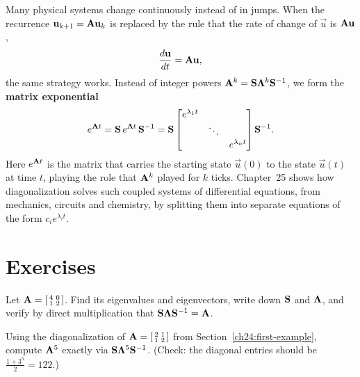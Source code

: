 Many physical systems change continuously instead of in jumps. When the
recurrence $\mathbf{u}_{k+1} = \mathbf{A}\mathbf{u}_k$ is replaced by the rule that the
rate of change of $\vec{u}$ is $\mathbf{A}\mathbf{u}$,
\[
  \frac{d\mathbf{u}}{dt} = \mathbf{A}\mathbf{u},
\]
the same strategy works. Instead of integer powers $\mathbf{A}^k = \mathbf{S}\mathbf{\Lambda}^k\mathbf{S}^{-1}$,
we form the \textbf{matrix exponential}
\[
  e^{\mathbf{A}t} = \mathbf{S}\,e^{\mathbf{\Lambda}t}\,\mathbf{S}^{-1}
  = \mathbf{S}\begin{bmatrix} e^{\lambda_1 t} & & \\ & \ddots & \\ & & e^{\lambda_n t} \end{bmatrix}\mathbf{S}^{-1}.
\]
Here $e^{\mathbf{A}t}$ is the matrix that carries the starting state $\vec{u}(0)$
to the state $\vec{u}(t)$ at time $t$, playing the role that $\mathbf{A}^k$ played
for $k$ ticks. Chapter~25 shows how diagonalization solves such coupled systems
of differential equations, from mechanics, circuits and chemistry, by splitting
them into separate equations of the form $c_i e^{\lambda_i t}$.

\section*{Exercises}

\begin{exercise}
\label{ch24:ex-warmup}
Let $\mathbf{A} = \begin{bsmallmatrix} 4 & 0 \\ 1 & 2 \end{bsmallmatrix}$. Find its
eigenvalues and eigenvectors, write down $\mathbf{S}$ and $\mathbf{\Lambda}$, and verify
by direct multiplication that $\mathbf{S}\mathbf{\Lambda}\mathbf{S}^{-1} = \mathbf{A}$.
\end{exercise}

\begin{exercise}[A power]
\label{ch24:ex-power}
Using the diagonalization of $\mathbf{A} = \begin{bsmallmatrix} 2 & 1 \\ 1 & 2
\end{bsmallmatrix}$ from Section~\ref{ch24:first-example}, compute $\mathbf{A}^5$
exactly via $\mathbf{S}\mathbf{\Lambda}^5\mathbf{S}^{-1}$. (Check: the diagonal entries
should be $\tfrac{1+3^5}{2} = 122$.)
\end{exercise}

